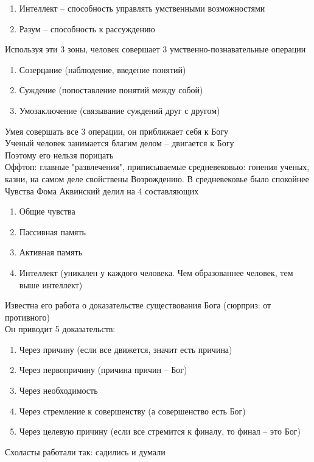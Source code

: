 \documentclass[12pt]{article}
\begin{document}
\begin{enumerate}
\begin{enumerate}
        \item Интеллект -- способность управлять умственными возможностями
        \item Разум -- способность к рассуждению
    \end{enumerate}
    Используя эти 3 зоны, человек совершает 3 умственно-познавательные операции
    \begin{enumerate}
        \item Созерцание (наблюдение, введение понятий)
        \item Суждение (попоставление понятий между собой)
        \item Умозаключение (связывание суждений друг с другом)
    \end{enumerate}
    Умея совершать все 3 операции, он приближает себя к Богу\\
    Ученый человек занимается благим делом -- двигается к Богу\\
    Поэтому его нельзя порицать\\
    Оффтоп: главные "развлечения", приписываемые средневековью: гонения ученых, казни, на самом деле свойствены Возрождению. В средневековье было спокойнее\\
    Чувства Фома Аквинский делил на 4 составляющих
    \begin{enumerate}
        \item Общие чувства
        \item Пассивная память 
        \item Активная память
        \item Интеллект (уникален у каждого человека. Чем образованнее человек, тем выше интеллект)
    \end{enumerate}
    Известна его работа о доказательстве существования Бога (сюрприз: от противного)\\
    Он приводит 5 доказательств:
    \begin{enumerate}
        \item Через причину (если все движется, значит есть причина)
        \item Через первопричину (причина причин -- Бог)
        \item Через необходимость
        \item Через стремление к совершенству (а совершенство есть Бог)
        \item Через целевую причину (если все стремится к финалу, то финал -- это Бог)
    \end{enumerate}
    Схоласты работали так: садились и думали
\end{enumerate}
\end{document}
